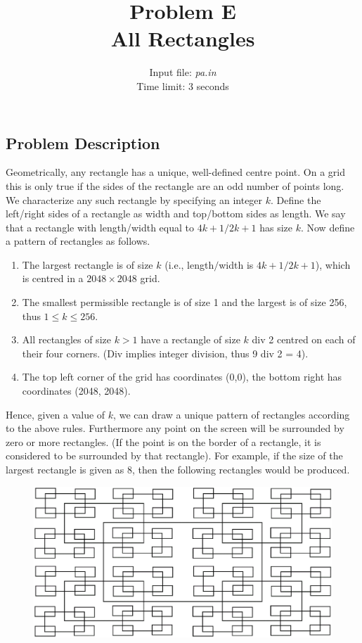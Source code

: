 \documentclass[12pt]{article}
\begin{document}
\title{Problem E \\ All Rectangles}
\author{Input file: {\em pa.in} \\ Time limit: 3 seconds}
\date{}
\maketitle
\thispagestyle{empty}

\subsection*{Problem Description}

Geometrically, any rectangle has a unique, well-defined centre point. On a grid this is only true if the sides of the rectangle are an odd number of points long. We characterize any such rectangle by specifying an integer $k$. Define the left/right sides of a rectangle as width and top/bottom sides as length. We say that a rectangle with length/width equal to $4k+1/2k+1$ has size $k$. Now define a pattern of rectangles as follows.

\begin{enumerate}
  \item The largest rectangle is of size $k$ (i.e., length$/$width is $4k+1/2k+1$), which is centred in a $2048 \times 2048$ grid.
  \item The smallest permissible rectangle is of size 1 and the largest is of size 256, thus $1 \le k \le 256$.
  \item All rectangles of size $k > 1$ have a rectangle of size $k$ div 2 centred on each of their four corners. (Div implies integer division, thus 9 div 2 = 4).
  \item The top left corner of the grid has coordinates (0,0), the bottom right has coordinates (2048, 2048).
\end{enumerate}

Hence, given a value of $k$, we can draw a unique pattern of rectangles according to the above rules. Furthermore any point on the screen will be surrounded by zero or more rectangles. (If the point is on the border of a rectangle, it is considered to be surrounded by that rectangle). For example, if the size of the largest rectangle is given as 8, then the following rectangles would be produced.

        \begin{figure}[!h]
        \centering
        \includegraphics[scale=0.6]{Rectangle.eps}
        \label{fig:fig3.3}
        \end{figure}
\end{document}
